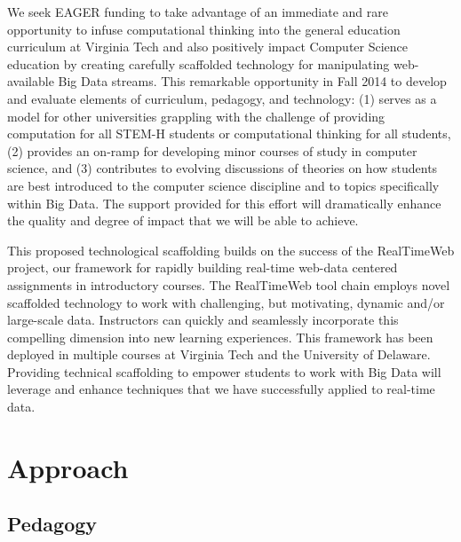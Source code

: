 \documentclass[11pt]{article}
\begin{document}
We seek EAGER funding to take advantage of an immediate and rare opportunity to infuse computational thinking into the general education curriculum at Virginia Tech\cite{vt-horizon} and also positively impact Computer Science education by creating carefully scaffolded technology for manipulating web-available Big Data streams. This remarkable opportunity in Fall 2014 to develop and evaluate elements of curriculum, pedagogy, and technology: (1) serves as a model for other universities grappling with the challenge of providing computation for all STEM-H students or computational thinking for all students, (2) provides an on-ramp for developing minor courses of study in computer science, and (3) contributes to evolving discussions of theories on how students are best introduced to the computer science discipline and to topics specifically within Big Data. The support provided for this effort will dramatically enhance the quality and degree of impact that we will be able to achieve. 

This proposed technological scaffolding builds on the success of the RealTimeWeb project, our framework for rapidly building real-time web-data centered assignments in introductory courses\cite{bart-rtw}.
The RealTimeWeb tool chain employs novel scaffolded technology to work with challenging, but motivating, dynamic and/or large-scale data.
Instructors can quickly and seamlessly incorporate this compelling dimension into new learning experiences.
This framework has been deployed in multiple courses at Virginia Tech and the University of Delaware\cite{bart-rtw-success}.
Providing technical scaffolding to empower students to work with Big Data will leverage and enhance techniques that we have successfully applied to real-time data.

\section{Approach}

\subsection{Pedagogy}
\end{document}
